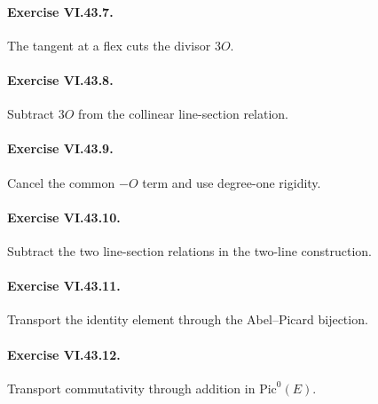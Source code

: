 \paragraph{Exercise VI.43.7.}
\begin{hint}
The tangent at a flex cuts the divisor \(3O\).
\end{hint}

\paragraph{Exercise VI.43.8.}
\begin{hint}
Subtract \(3O\) from the collinear line-section relation.
\end{hint}

\paragraph{Exercise VI.43.9.}
\begin{hint}
Cancel the common \(-O\) term and use degree-one rigidity.
\end{hint}

\paragraph{Exercise VI.43.10.}
\begin{hint}
Subtract the two line-section relations in the two-line construction.
\end{hint}

\paragraph{Exercise VI.43.11.}
\begin{hint}
Transport the identity element through the Abel--Picard bijection.
\end{hint}

\paragraph{Exercise VI.43.12.}
\begin{hint}
Transport commutativity through addition in \(\mathrm{Pic}^0(E)\).
\end{hint}

